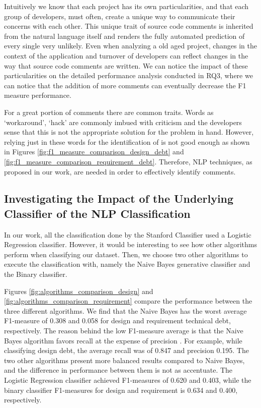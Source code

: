 
 Intuitively we know that each project has its own particularities, and that each group of developers, must often, create a unique way to communicate their concerns with each other. This unique trait of source code comments is inherited from the natural language itself and renders the fully automated prediction of every single \SATD very unlikely. Even when analyzing a old aged project, changes in the context of the application and turnover of developers can reflect changes in the way that source code comments are written. We can notice the impact of these particularities on the detailed performance analysis conducted in RQ3, where we can notice that the addition of more comments can eventually decrease the F1 measure performance.


For a great portion of \SATD comments there are common traits. Words as `workaround', `hack' are commonly imbued with criticism and the developers sense that this is not the appropriate solution for the problem in hand. However, relying just in these words for the identification of \SATD is not good enough as shown in Figures \ref{fig:f1_measure_comparison_design_debt} and \ref{fig:f1_measure_comparison_requirement_debt}. Therefore, NLP techniques, as proposed in our work, are needed in order to effectively identify \SATD comments.

\subsection{Investigating the Impact of the Underlying Classifier of the NLP Classification}

In our work, all the classification done by the Stanford Classifier used a Logistic Regression classifier. However, it would be interesting to see how other algorithms perform when classifying our dataset. Then, we choose two other algorithms to execute the classification with, namely the Naive Bayes generative classifier and the Binary classifier.

Figures \ref{fig:algorithms_comparison_design} and \ref{fig:algorithms_comparison_requirement} compare the performance between the three different algorithms. We find that the Naive Bayes has the worst average F1-measure of 0.308 and 0.058 for design and requirement technical debt, respectively. The reason behind the low F1-measure average is that the Naive Bayes algorithm favors recall at the expense of precision . For example, while classifying design debt, the average recall was of 0.847 and precision 0.195. The two other algorithms present more balanced results compared to Naive Bayes, and the difference in performance between them is not as accentuate. The Logistic Regression classifier achieved F1-measures of 0.620 and 0.403, while the binary classifier F1-measures for design and requirement \SATD is 0.634 and 0.400, respectively. 

